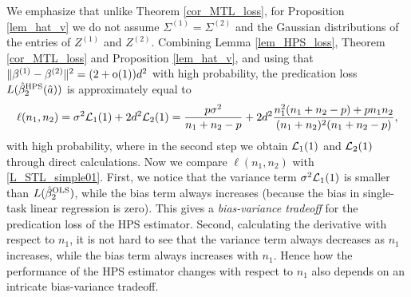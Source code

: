We emphasize that unlike Theorem \ref{cor_MTL_loss}, for Proposition \ref{lem_hat_v} we do not assume $\Sigma^{(1)}=\Sigma^{(2)}$ and the Gaussian distributions of the entries of $Z^{(1)}$ and $Z^{(2)}$. Combining Lemma \ref{lem_HPS_loss}, Theorem \ref{cor_MTL_loss} and Proposition \ref{lem_hat_v}, and using  that $\|\beta^{(1)}-\beta^{(2)}\|^2 = (2+\oo(1))d^2$ with high probability, the predication loss $L(\hat{\beta}_2^{\MTL}(\hat a)) $ is approximately equal to
$$\ell(n_1,n_2)= \sigma^2 \cal L_1(1) +   2d^2 \cal L_2(1)= \frac{p\sigma^2}{n_1+n_2-p} +  2d^2  \frac{n_1^2 (n_1+n_2-p)+p n_1n_2}{(n_1+n_2)^2(n_1+n_2-p)}, $$
with high probability, where in the second step we obtain $\cal L_1(1)$ and $\cal L_2(1)$ through direct calculations.
Now we compare $\ell(n_1,n_2)$ with \eqref{L_STL_simple01}. First, we notice that the variance term $\sigma^2 \cal L_1(1)$ is smaller than $L(\hat{\beta}_2^{\STL} )$, while the bias term always increases (because the bias in single-task linear regression is zero). This gives a \emph{bias-variance tradeoff} for the predication loss of the HPS estimator. Second, calculating the derivative with respect to $n_1$, it is not hard to see that the variance term always decreases as $n_1$ increases, while the bias term always increases with $n_1$. Hence how the performance of the HPS estimator changes with respect to $n_1$ also depends on an intricate bias-variance tradeoff.

